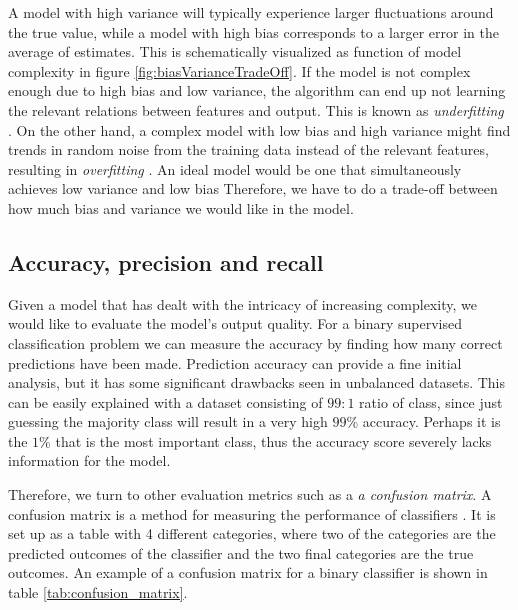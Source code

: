 A model with high variance will typically experience larger fluctuations around the true value, while a model with high bias corresponds to a larger error in the average of estimates. This is schematically visualized as function of model complexity in figure  \ref{fig:biasVarianceTradeOff}. If the model is not complex enough due to high bias and low variance, the algorithm can end up not learning the relevant relations between features and output. This is known as \textit{underfitting} \cite{Murphy2012}. On the other hand, a complex model with low bias and high variance might find trends in random noise from the training data instead of the relevant features, resulting in \textit{overfitting} \cite{Murphy2012}. An ideal model would be one that simultaneously achieves low variance and low bias  Therefore, we have to do a trade-off between how much bias and variance we would like in the model.

\subsection{Accuracy, precision and recall}

Given a model that has dealt with the intricacy of increasing complexity, we would like to evaluate the model's output quality. For a binary supervised classification problem we can measure the accuracy by finding how many correct predictions have been made. Prediction accuracy can provide a fine initial analysis, but it has some significant drawbacks seen in unbalanced datasets. This can be easily explained with a dataset consisting of $99:1$ ratio of class, since just guessing the majority class will result in a very high $99\%$ accuracy. Perhaps it is the $1\%$ that is the most important class, thus the accuracy score severely lacks information for the model.

Therefore, we turn to other evaluation metrics such as a \textit{a confusion matrix}. A confusion matrix is a method for measuring the performance of classifiers \cite{Murphy2012}. It is set up as a table with 4 different categories, where two of the categories are the predicted outcomes of the classifier and the two final categories are the true outcomes. An example of a confusion matrix for a binary classifier is shown in table \ref{tab:confusion_matrix}.

